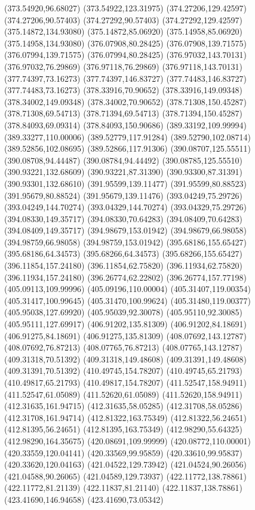 {(373.54920,96.68027) (373.54922,123.31975) (374.27206,129.42597) (374.27206,90.57403) (374.27292,90.57403) (374.27292,129.42597) (375.14872,134.93080) (375.14872,85.06920)
(375.14958,85.06920) (375.14958,134.93080) (376.07908,80.28425) (376.07908,139.71575) (376.07994,139.71575) (376.07994,80.28425) (376.97032,143.70131) (376.97032,76.29869)
(376.97118,76.29869) (376.97118,143.70131) (377.74397,73.16273) (377.74397,146.83727) (377.74483,146.83727) (377.74483,73.16273) (378.33916,70.90652) (378.33916,149.09348)
(378.34002,149.09348) (378.34002,70.90652) (378.71308,150.45287) (378.71308,69.54713) (378.71394,69.54713) (378.71394,150.45287) (378.84093,69.09314) (378.84093,150.90686)
(389.33192,109.99994) (389.33277,110.00006) (389.52779,117.91284) (389.52790,102.08714) (389.52856,102.08695) (389.52866,117.91306) (390.08707,125.55511) (390.08708,94.44487)
(390.08784,94.44492) (390.08785,125.55510) (390.93221,132.68609) (390.93221,87.31390) (390.93300,87.31391) (390.93301,132.68610) (391.95599,139.11477) (391.95599,80.88523)
(391.95679,80.88524) (391.95679,139.11476) (393.04249,75.29726) (393.04249,144.70274) (393.04329,144.70274) (393.04329,75.29726) (394.08330,149.35717) (394.08330,70.64283)
(394.08409,70.64283) (394.08409,149.35717) (394.98679,153.01942) (394.98679,66.98058) (394.98759,66.98058) (394.98759,153.01942) (395.68186,155.65427) (395.68186,64.34573)
(395.68266,64.34573) (395.68266,155.65427) (396.11854,157.24180) (396.11854,62.75820) (396.11934,62.75820) (396.11934,157.24180) (396.26774,62.22802) (396.26774,157.77198)
(405.09113,109.99996) (405.09196,110.00004) (405.31407,119.00354) (405.31417,100.99645) (405.31470,100.99624) (405.31480,119.00377) (405.95038,127.69920) (405.95039,92.30078)
(405.95110,92.30085) (405.95111,127.69917) (406.91202,135.81309) (406.91202,84.18691) (406.91275,84.18691) (406.91275,135.81309) (408.07692,143.12787) (408.07692,76.87213)
(408.07765,76.87213) (408.07765,143.12787) (409.31318,70.51392) (409.31318,149.48608) (409.31391,149.48608) (409.31391,70.51392) (410.49745,154.78207) (410.49745,65.21793)
(410.49817,65.21793) (410.49817,154.78207) (411.52547,158.94911) (411.52547,61.05089) (411.52620,61.05089) (411.52620,158.94911) (412.31635,161.94715) (412.31635,58.05285)
(412.31708,58.05286) (412.31708,161.94714) (412.81322,163.75349) (412.81322,56.24651) (412.81395,56.24651) (412.81395,163.75349) (412.98290,55.64325) (412.98290,164.35675)
(420.08691,109.99999) (420.08772,110.00001) (420.33559,120.04141) (420.33569,99.95859) (420.33610,99.95837) (420.33620,120.04163) (421.04522,129.73942) (421.04524,90.26056)
(421.04588,90.26065) (421.04589,129.73937) (422.11772,138.78861) (422.11772,81.21139) (422.11837,81.21140) (422.11837,138.78861) (423.41690,146.94658) (423.41690,73.05342)
}
